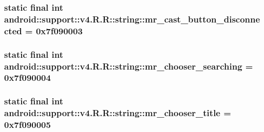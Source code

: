 \hypertarget{classandroid_1_1support_1_1v4_1_1_r_1_1string_eebee8a9025ae13c255fcc36da088181}{
\subsubsection[{mr\_\-cast\_\-button\_\-disconnected}]{\setlength{\rightskip}{0pt plus 5cm}static final int android::support::v4.R.R::string::mr\_\-cast\_\-button\_\-disconnected = 0x7f090003}}
\label{classandroid_1_1support_1_1v4_1_1_r_1_1string_eebee8a9025ae13c255fcc36da088181}


\hypertarget{classandroid_1_1support_1_1v4_1_1_r_1_1string_f8aa34db05a5674af82944fd1a5d85fa}{
\subsubsection[{mr\_\-chooser\_\-searching}]{\setlength{\rightskip}{0pt plus 5cm}static final int android::support::v4.R.R::string::mr\_\-chooser\_\-searching = 0x7f090004}}
\label{classandroid_1_1support_1_1v4_1_1_r_1_1string_f8aa34db05a5674af82944fd1a5d85fa}


\hypertarget{classandroid_1_1support_1_1v4_1_1_r_1_1string_c62be1482d0971086f9caa71a510fb57}{
\subsubsection[{mr\_\-chooser\_\-title}]{\setlength{\rightskip}{0pt plus 5cm}static final int android::support::v4.R.R::string::mr\_\-chooser\_\-title = 0x7f090005}}
\label{classandroid_1_1support_1_1v4_1_1_r_1_1string_c62be1482d0971086f9caa71a510fb57}



